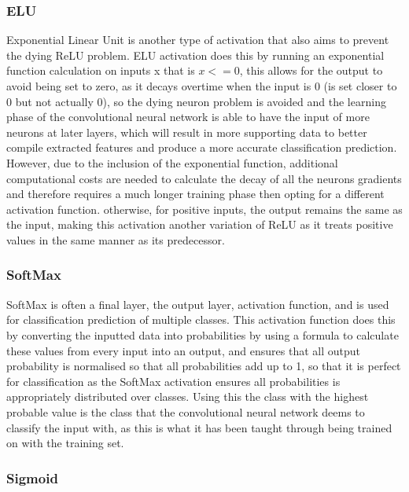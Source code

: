\documentclass[]{final_report}
\begin{document}
\subsubsection{ELU}

Exponential Linear Unit is another type of activation that also aims to prevent the dying ReLU problem. ELU activation does this by running an exponential function calculation on inputs x that is $x<=0$, this allows for the output to avoid being set to zero, as it decays overtime when the input is 0 (is set closer to 0 but not actually 0), so the dying neuron problem is avoided and the learning phase of the convolutional neural network is able to have the input of more neurons at later layers, which will result in more supporting data to better compile extracted features and produce a more accurate classification prediction. However, due to the inclusion of the exponential function, additional computational costs are needed to calculate the decay of all the neurons gradients and therefore requires a much longer training phase then opting for a different activation function. otherwise, for positive inputs, the output remains the same as the input, making this activation another variation of ReLU as it treats positive values in the same manner as its predecessor.\cite{DataScienceStackExchange2025}

\subsubsection{SoftMax}

SoftMax is often a final layer, the output layer, activation function, and is used for classification prediction of multiple classes. This activation function does this by converting the inputted data into probabilities by using a formula to calculate these values from every input into an output, and ensures that all output probability is normalised so that all probabilities add up to 1, so that it is perfect for classification as the SoftMax activation ensures all probabilities is appropriately distributed over classes. Using this the class with the highest probable value is the class that the convolutional neural network deems to classify the input with, as this is what it has been taught through being trained on with the training set.\cite{UpGrad2025}

\subsubsection{Sigmoid}
\end{document}
